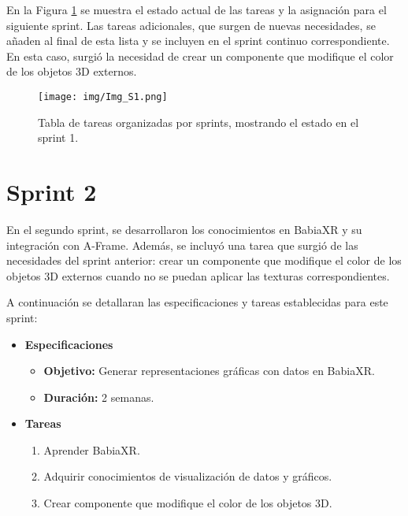 \documentclass[a4paper, 12pt]{book}
\begin{document}
        En la Figura \ref{fig:S01} se muestra el estado actual de las tareas y la asignación para el siguiente sprint. Las tareas adicionales, que surgen de nuevas necesidades, se añaden al final de esta lista y se incluyen en el sprint continuo correspondiente. En esta caso, surgió la necesidad de crear un componente que modifique el color de los objetos 3D externos. 
            \begin{figure}[H]
                \centering
                \texttt{[image: img/Img\_S1.png]}
                \caption{\footnotesize Tabla de tareas organizadas por sprints, mostrando el estado en el sprint 1.}
                \label{fig:S01}
            \end{figure}            
   
    \newpage
    \section{Sprint 2}

    En el segundo sprint, se desarrollaron los conocimientos en BabiaXR y su integración con A-Frame. Además, se incluyó una tarea que surgió de las necesidades del sprint anterior: crear un componente que modifique el color de los objetos 3D externos cuando no se puedan aplicar las texturas correspondientes.
    
    A continuación se detallaran las especificaciones y tareas establecidas para este sprint:


        \begin{itemize}
            \item \textbf{Especificaciones}
            \begin{itemize}
                \item \textbf{Objetivo:} Generar representaciones gráficas con datos en BabiaXR.
                \item \textbf{Duración:} 2 semanas.

            \end{itemize}
            
            \item \textbf{Tareas}
            \begin{enumerate}
                \item Aprender BabiaXR. 
                \item Adquirir conocimientos de visualización de datos y gráficos.
                \item Crear componente que modifique el color de los objetos 3D.       
            \end{enumerate}
            \end{itemize}
            
\end{document}
